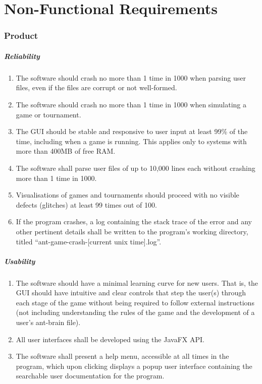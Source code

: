 \documentclass[11pt]{article}
\providecommand{\tightlist}{%
  \setlength{\itemsep}{0pt}\setlength{\parskip}{0pt}}
\begin{document}
\newpage
\section{Non-Functional Requirements}

\subsubsection{Product}\label{product}

\subparagraph{Reliability}\label{reliability}

\begin{enumerate}
\def\labelenumi{\arabic{enumi}.}
\tightlist
\item
  The software should crash no more than 1 time in 1000 when parsing
  user files, even if the files are corrupt or not well-formed.
\item
  The software should crash no more than 1 time in 1000 when simulating
  a game or tournament.
\item
  The GUI should be stable and responsive to user input at least 99\% of
  the time, including when a game is running. This applies only to
  systems with more than 400MB of free RAM.
\item
  The software shall parse user files of up to 10,000 lines each without
  crashing more than 1 time in 1000.
\item
  Visualisations of games and tournaments should proceed with no visible
  defects (glitches) at least 99 times out of 100.
\item
  If the program crashes, a log containing the stack trace of the error
  and any other pertinent details shall be written to the program's
  working directory, titled ``ant-game-crash-{[}current unix
  time{]}.log''.
\end{enumerate}

\subparagraph{Usability}\label{usability}

\begin{enumerate}
\def\labelenumi{\arabic{enumi}.}
\tightlist
\item
  The software should have a minimal learning curve for new users. That
  is, the GUI should have intuitive and clear controls that step the
  user(s) through each stage of the game without being required to
  follow external instructions (not including understanding the rules of
  the game and the development of a user's ant-brain file).
\item
  All user interfaces shall be developed using the JavaFX API.
\item
  The software shall present a help menu, accessible at all times in the
  program, which upon clicking displays a popup user interface
  containing the searchable user documentation for the program.
\end{enumerate}
\end{document}
